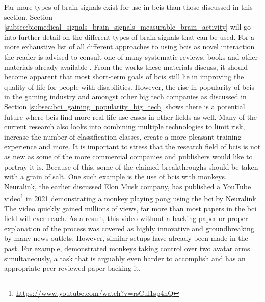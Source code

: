 Far more types of brain signals exist for use in \glspl{bci} than those discussed in this section.
Section \ref{subsec:biomedical_signals_brain_signals_measurable_brain_activity} will go into further detail on the different types of brain-signals that can be used.
For a more exhaustive list of all different approaches to using \glspl{bci} as novel interaction the reader is advised to consult one of many systematic reviews, books and other materials already available \citep{bci_review_book_chapter, bci_review, bci_in_medicine, bci_history, bci_review_monkey, bci_handbook}.
From the works these materials discuss, it should become apparent that most short-term goals of \glspl{bci} still lie in improving the quality of life for people with disabilities.
However, the rise in popularity of \glspl{bci} in the gaming industry and amongst other big tech companies as discussed in Section \ref{subsec:bci_gaining_popularity_big_tech} shows there is a potential future where \glspl{bci} find more real-life use-cases in other fields as well.
Many of the current research also looks into combining multiple technologies to limit risk, increase the number of classification classes, create a more pleasant training experience and more.
It is important to stress that the research field of \glspl{bci} is not as new as some of the more commercial companies and publishers would like to portray it is.
Because of this, some of the claimed breakthroughs should be taken with a grain of salt.
One such example is the use of \glspl{bci} with monkeys.
Neuralink, the earlier discussed Elon Musk company, has published a YouTube video\footnote{\url{https://www.youtube.com/watch?v=rsCul1sp4hQ}} in 2021 demonstrating a monkey playing pong using the \gls{bci} by Neuralink.
The video quickly gained millions of views, far more than most papers in the \gls{bci} field will ever reach.
As a result, this video without a backing paper or proper explanation of the process was covered as highly innovative and groundbreaking by many news outlets.
However, similar setups have already been made in the past.
For example, \citet{bci_monkey_arms} demonstrated monkeys taking control over two avatar arms simultaneously, a task that is arguably even harder to accomplish and has an appropriate peer-reviewed paper backing it.




